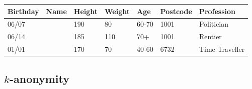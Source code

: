 \begin{frame}
  \begin{example}
    \begin{table}[H]
      \begin{tabular}{l|l|l|l|l|l|l}
        Birthday & Name & Height  & Weight & Age & Postcode & Profession\\
        \hline
        06/07 & & 190 & 80 & 60-70 & 1001 & Politician\\
        06/14 &  & 185 & 110 & 70+ & 1001 & Rentier\\
        01/01 &  & 170 & 70 & 40-60 & 6732 & Time Traveller
      \end{tabular}
    \end{table}
  \end{example}
\end{frame}



\subsection{$k$-anonymity}

